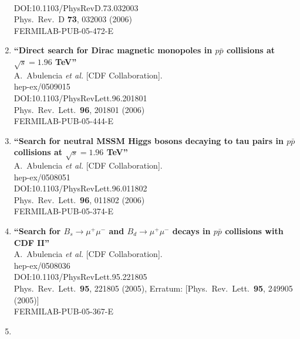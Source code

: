 \documentclass{article}
\begin{document}
\begin{enumerate}
  \\{}DOI:10.1103/PhysRevD.73.032003
  \\{}Phys.\ Rev.\ D {\bf 73}, 032003 (2006)
  \\{}FERMILAB-PUB-05-472-E
\item%
{\bf ``Direct search for Dirac magnetic monopoles in $p\bar{p}$ collisions at $\sqrt{s} = 1.96$ TeV''}
  \\{}A.~Abulencia {\it et al.} [CDF Collaboration].
  \\{}hep-ex/0509015
  \\{}DOI:10.1103/PhysRevLett.96.201801
  \\{}Phys.\ Rev.\ Lett.\  {\bf 96}, 201801 (2006)
  \\{}FERMILAB-PUB-05-444-E
\item%
{\bf ``Search for neutral MSSM Higgs bosons decaying to tau pairs in $p\bar{p}$ collisions at $\sqrt{s} = 1.96$ TeV''}
  \\{}A.~Abulencia {\it et al.} [CDF Collaboration].
  \\{}hep-ex/0508051
  \\{}DOI:10.1103/PhysRevLett.96.011802
  \\{}Phys.\ Rev.\ Lett.\  {\bf 96}, 011802 (2006)
  \\{}FERMILAB-PUB-05-374-E
\item%
{\bf ``Search for $B_s \to \mu^+ \mu^-$ and $B_d \to \mu^+ \mu^-$ decays in $p\bar{p}$ collisions with CDF II''}
  \\{}A.~Abulencia {\it et al.} [CDF Collaboration].
  \\{}hep-ex/0508036
  \\{}DOI:10.1103/PhysRevLett.95.221805
  \\{}Phys.\ Rev.\ Lett.\  {\bf 95}, 221805 (2005), Erratum: [Phys.\ Rev.\ Lett.\  {\bf 95}, 249905 (2005)]
  \\{}FERMILAB-PUB-05-367-E
\item%

\end{enumerate}
\end{document}
